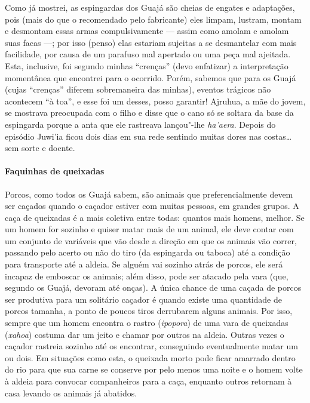 Como já mostrei, as espingardas dos Guajá são cheias de engates e
adaptações, pois (mais do que o recomendado pelo fabricante) eles
limpam, lustram, montam e desmontam essas armas compulsivamente --- assim
como amolam e amolam suas facas ---; por isso (penso) elas estariam
sujeitas a se desmantelar com mais facilidade, por causa de um parafuso
mal apertado ou uma peça mal ajeitada. Esta, inclusive, foi segundo
minhas ``crenças'' (devo enfatizar) a interpretação momentânea que
encontrei para o ocorrido. Porém, sabemos que para os Guajá (cujas
``crenças'' diferem sobremaneira das minhas), eventos trágicos não
acontecem ``à toa'', e esse foi um desses, posso garantir! Ajruhua, a mãe
do jovem, se mostrava preocupada com o filho e disse que o cano só se
soltara da base da espingarda porque a anta que ele rastreava lançou"-lhe
\emph{ha'aera}. Depois do episódio Juwi'ia ficou dois dias em sua rede
sentindo muitas dores nas costas\ldots{} sem sorte e doente.

\paragraph{Faquinhas de queixadas}

Porcos, como todos os Guajá sabem, são animais que preferencialmente
devem ser caçados quando o caçador estiver com muitas pessoas, em
grandes grupos. A caça de queixadas é a mais coletiva entre todas:
quantos mais homens, melhor. Se um homem for sozinho e quiser matar mais
de um animal, ele deve contar com um conjunto de variáveis que vão desde
a direção em que os animais vão correr, passando pelo acerto ou não do
tiro (da espingarda ou taboca) até a condição para transporte até a
aldeia. Se alguém vai sozinho atrás de porcos, ele será incapaz de
emboscar os animais; além disso, pode ser atacado pela vara (que,
segundo os Guajá, devoram até onças). A única chance de uma caçada de
porcos ser produtiva para um solitário caçador é quando existe uma
quantidade de porcos tamanha, a ponto de poucos tiros derrubarem alguns
animais. Por isso, sempre que um homem encontra o rastro
(\emph{ipopora}) de uma vara de queixadas (\emph{xahoa}) costuma dar um
jeito e chamar por outros na aldeia. Outras vezes o caçador rastreia
sozinho até os encontrar, conseguindo eventualmente matar um ou dois. Em
situações como esta, o queixada morto pode ficar amarrado dentro do rio
para que sua carne se conserve por pelo menos uma noite e o homem volte
à aldeia para convocar companheiros para a caça, enquanto outros
retornam à casa levando os animais já abatidos.

